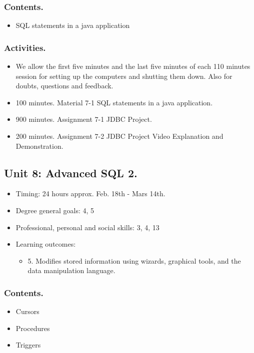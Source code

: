 \documentclass[catalan, a4paper, 12pt, titlepage]{article}
\begin{document}
  \subsubsection{Contents.}
  \begin{itemize}
	  \item SQL statements in a java application
  \end{itemize}

  \subsubsection{Activities.}
  \begin{itemize}
          \item We allow the first five minutes and the last five minutes of each 110 minutes session for setting up the computers and shutting them down. Also for doubts, questions and feedback.
	  \item 100 minutes. Material 7-1 SQL statements in a java application.
	  \item 900 minutes. Assignment 7-1 JDBC Project.
	  \item 200 minutes. Assignment 7-2 JDBC Project Video Explanation and Demonstration.
  \end{itemize}

  \subsection{Unit 8: Advanced SQL 2.}

  \begin{itemize}
	\item Timing: 24 hours approx. Feb. 18th - Mars 14th.
	\item Degree general goals: 4, 5
	\item Professional, personal and social skills: 3, 4, 13
	\item Learning outcomes: 
		\begin{itemize}
			\item 5. Modifies stored information using wizards, graphical tools, and the data manipulation language.
		\end{itemize}
  \end{itemize}

  \subsubsection{Contents.}
  \begin{itemize}
	  \item Cursors
	  \item Procedures
	  \item Triggers
  \end{itemize}
\end{document}
